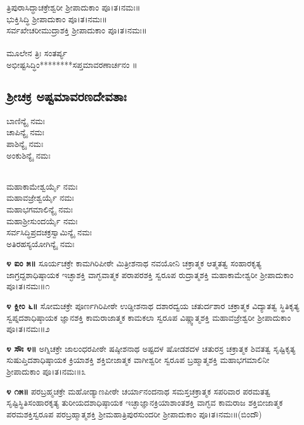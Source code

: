  ತ್ರಿಪುರಾಸಿದ್ಧಾಚಕ್ರೇಶ್ವರೀ ಶ್ರೀಪಾದುಕಾಂ ಪೂ।ತ।ನಮಃ॥\\
 ಭುಕ್ತಿಸಿದ್ಧಿ ಶ್ರೀಪಾದುಕಾಂ ಪೂ।ತ।ನಮಃ॥\\
 ಸರ್ವಖೇಚರೀಮುದ್ರಾಶಕ್ತಿ ಶ್ರೀಪಾದುಕಾಂ ಪೂ।ತ।ನಮಃ॥\\
\\
ಮೂಲೇನ ತ್ರಿಃ ಸಂತರ್ಪ್ಯ\\
 ಅಭೀಷ್ಟಸಿದ್ಧಿಂ********ಸಪ್ತಮಾವರಣಾರ್ಚನಂ ॥
\subsection{ಶ್ರೀಚಕ್ರ ಅಷ್ಟಮಾವರಣದೇವತಾಃ}
 ಬಾಣಿನ್ಯೈ ನಮಃ\\
 ಚಾಪಿನ್ಯೈ ನಮಃ\\
 ಪಾಶಿನ್ಯೈ ನಮಃ\\
 ಅಂಕುಶಿನ್ಯೈ ನಮಃ

\\
 ಮಹಾಕಾಮೇಶ್ವರ್ಯೈ ನಮಃ\\
 ಮಹಾವಜ್ರೇಶ್ವರ್ಯೈ ನಮಃ\\
 ಮಹಾಭಗಮಾಲಿನ್ಯೈ ನಮಃ\\
 ಮಹಾಶ್ರೀಸುಂದರ್ಯೈ ನಮಃ\\
 ಸರ್ವಸಿದ್ಧಿಪ್ರದಚಕ್ರಸ್ವಾಮಿನ್ಯೈ ನಮಃ\\
ಅತಿರಹಸ್ಯಯೋಗಿನ್ಯೈ ನಮಃ

{\bfseries ೪ ಐಂ ೫॥} ಸೂರ್ಯಚಕ್ರೇ ಕಾಮಗಿರಿಪೀಠೇ ಮಿತ್ರೀಶನಾಥ ನವಯೋನಿ ಚಕ್ರಾತ್ಮಕ ಆತ್ಮತತ್ವ ಸಂಹಾರಕೃತ್ಯ ಜಾಗ್ರದ್ದಶಾಧಿಷ್ಠಾಯಕ ಇಚ್ಛಾಶಕ್ತಿ ವಾಗ್ಭವಾತ್ಮಕ ಪರಾಪರಶಕ್ತಿ ಸ್ವರೂಪ ರುದ್ರಾತ್ಮಶಕ್ತಿ ಮಹಾಕಾಮೇಶ್ವರೀ ಶ್ರೀಪಾದುಕಾಂ ಪೂ।ತ।ನಮಃ॥೧

{\bfseries೪ ಕ್ಲೀಂ ೬॥} ಸೋಮಚಕ್ರೇ ಪೂರ್ಣಗಿರಿಪೀಠೇ ಉಡ್ಡೀಶನಾಥ  ದಶಾರದ್ವಯ ಚತುರ್ದಶಾರ ಚಕ್ರಾತ್ಮಕ ವಿದ್ಯಾತತ್ವ ಸ್ಥಿತಿಕೃತ್ಯ ಸ್ವಪ್ನದಶಾಧಿಷ್ಠಾಯಕ ಜ್ಞಾನಶಕ್ತಿ ಕಾಮರಾಜಾತ್ಮಕ ಕಾಮಕಲಾ ಸ್ವರೂಪ ವಿಷ್ಣ್ವಾತ್ಮಶಕ್ತಿ ಮಹಾವಜ್ರೇಶ್ವರೀ ಶ್ರೀಪಾದುಕಾಂ ಪೂ।ತ।ನಮಃ॥೨

{\bfseries೪ ಸೌಃ ೪॥} ಅಗ್ನಿಚಕ್ರೇ ಜಾಲಂಧರಪೀಠೇ  ಷಷ್ಠೀಶನಾಥ ಅಷ್ಟದಳ ಷೋಡಶದಳ ಚತುರಸ್ರ ಚಕ್ರಾತ್ಮಕ ಶಿವತತ್ವ ಸೃಷ್ಟಿಕೃತ್ಯ ಸುಷುಪ್ತಿದಶಾಧಿಷ್ಠಾಯಕ ಕ್ರಿಯಾಶಕ್ತಿ ಶಕ್ತಿಬೀಜಾತ್ಮಕ ವಾಗೀಶ್ವರೀ ಸ್ವರೂಪ ಬ್ರಹ್ಮಾತ್ಮಶಕ್ತಿ  ಮಹಾಭಗಮಾಲಿನೀ ಶ್ರೀಪಾದುಕಾಂ ಪೂ।ತ।ನಮಃ॥೩

{\bfseries೪ ೧೫॥} ಪರಬ್ರಹ್ಮಚಕ್ರೇ ಮಹೋಡ್ಯಾಣಪೀಠೇ ಚರ್ಯಾನಂದನಾಥ ಸಮಸ್ತಚಕ್ರಾತ್ಮಕ ಸಪರಿವಾರ ಪರಮತತ್ವ ಸೃಷ್ಟಿಸ್ಥಿತಿಸಂಹಾರಕೃತ್ಯ ತುರೀಯದಶಾಧಿಷ್ಠಾಯಕ ಇಚ್ಛಾಜ್ಞಾನಕ್ರಿಯಾಶಾಂತಶಕ್ತಿ ವಾಗ್ಭವ ಕಾಮರಾಜ ಶಕ್ತಿಬೀಜಾತ್ಮಕ ಪರಮಶಕ್ತಿಸ್ವರೂಪ ಪರಬ್ರಹ್ಮಾತ್ಮಶಕ್ತಿ ಶ್ರೀಮಹಾತ್ರಿಪುರಸುಂದರೀ ಶ್ರೀಪಾದುಕಾಂ ಪೂ।ತ।ನಮಃ॥(ಬಿಂದೌ)

